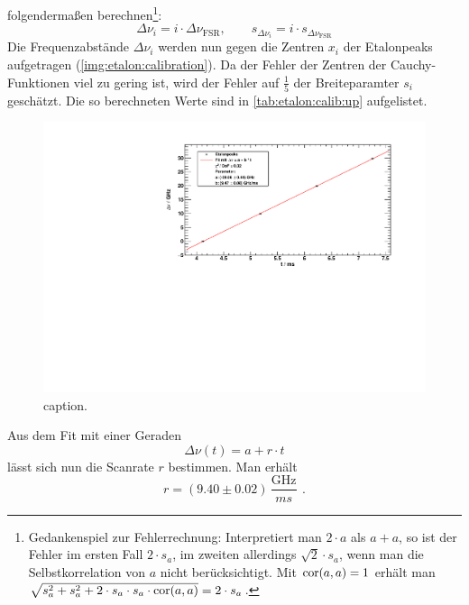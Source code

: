 folgendermaßen berechnen\footnote{Gedankenspiel zur Fehlerrechnung: Interpretiert man $2 \cdot a$ als $a + a$, so ist der Fehler im ersten Fall $2 \cdot s_a$, im zweiten 
allerdings $\sqrt{2} \cdot s_a$, wenn man die Selbstkorrelation von $a$ nicht berücksichtigt. Mit $\operatorname{cor}(a, a) = 1$ 
erhält man $\sqrt{s_a^2 + s_a^2 + 2 \cdot s_a \cdot s_a \cdot \operatorname{cor}(a, a)} = 2 \cdot s_a$.}: 
\begin{equation}
    \Delta \nu_i = i \cdot \Delta \nu_\text{FSR}, \qquad s_{\Delta \nu_i} = i \cdot s_{\Delta \nu_\text{FSR}} 
\end{equation}
Die Frequenzabstände $\Delta \nu_i$ werden nun gegen die Zentren $x_i$  der 
Etalonpeaks aufgetragen (\autoref{img:etalon:calibration}). Da der Fehler der Zentren der Cauchy-Funktionen viel zu gering ist, wird der Fehler 
auf $\frac{1}{5}$ der Breiteparamter $s_i$ geschätzt. Die so berechneten Werte sind in \autoref{tab:etalon:calib:up} aufgelistet.


\begin{figure}[H]
\begin{center}
  \includegraphics[width=\textwidth]{../img/part2/up-etalon_zoom-etalon_calibration.pdf}
  \caption{caption.}
  \label{img:etalon:calibration}
\end{center}
\end{figure}
Aus dem Fit mit einer Geraden 
\begin{equation}
    \Delta \nu(t) = a + r \cdot t  %
\end{equation}
lässt sich nun die Scanrate $r$ bestimmen. Man erhält %
\begin{equation}
    r = (9.40 \pm 0.02)\,\frac{\text{GHz}}{ms}\ \, .
\end{equation}

